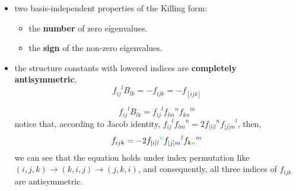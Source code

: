 \begin{itemize}
	\item two basis-independent properties of the Killing form:
	\begin{itemize}
		\item the \textbf{number} of zero eigenvalues.
		
		\item the \textbf{sign} of the non-zero eigenvalues.
	\end{itemize}
	
	\item the structure constants with lowered indices are \textbf{completely antisymmetric},
	\begin{equation}
		{f_{i j}}^l B_{l k} = - f_{i j k} = - f_{[i j k]}
	\end{equation}
	
	\begin{tcolorbox}[title=proof:]
		\begin{equation}
			{f_{i j}}^l B_{l k} = {f_{i j}}^l {f_{l m}}^n {f_{k n}}^m
		\end{equation}
		notice that, according to Jacob identity, ${f_{i j}}^l {f_{l m}}^n = 2 {f_{[i| l}}^n {f_{|j] m}}^l$, then,
		\begin{equation}
			f_{i j k} = - 2 {f_{[i| \mathcolor{red}{l}}}^{\mathcolor{green}{n}} {f_{|j] \mathcolor{blue}{m}}}^{\mathcolor{red}{l}} {f_{k \mathcolor{green}{n}}}^{\mathcolor{blue}{m}}
		\end{equation}
		we can see that the equation holds under index permutation like $(i, j, k) \rightarrow (k, i, j) \rightarrow (j, k, i)$, and consequently, all three indices of $f_{i j k}$ are antisymmetric.
	\end{tcolorbox}
\end{itemize}
